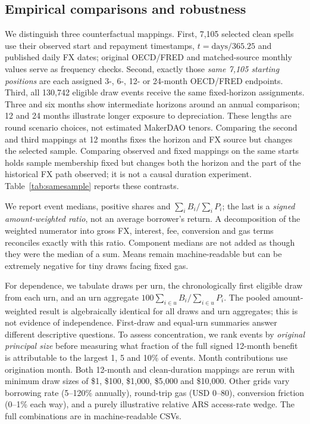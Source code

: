 \documentclass[sn-vancouver,Numbered]{sn-jnl}
\begin{document}
\subsection{Empirical comparisons and robustness}
We distinguish three counterfactual mappings. First, 7,105 selected clean spells use their observed start and repayment timestamps, $t=\text{days}/365.25$ and published daily FX dates; original OECD/FRED and matched-source monthly values serve as frequency checks. Second, exactly those \emph{same 7,105 starting positions} are each assigned 3-, 6-, 12- or 24-month OECD/FRED endpoints. Third, all 130,742 eligible draw events receive the same fixed-horizon assignments. Three and six months show intermediate horizons around an annual comparison; 12 and 24 months illustrate longer exposure to depreciation. These lengths are round scenario choices, not estimated MakerDAO tenors. Comparing the second and third mappings at 12 months fixes the horizon and FX source but changes the selected sample. Comparing observed and fixed mappings on the same starts holds sample membership fixed but changes both the horizon and the part of the historical FX path observed; it is not a causal duration experiment. Table~\ref{tab:samesample} reports these contrasts.

We report event medians, positive shares and $\sum_i B_i/\sum_iP_i$; the last is a \emph{signed amount-weighted ratio}, not an average borrower's return. A decomposition of the weighted numerator into gross FX, interest, fee, conversion and gas terms reconciles exactly with this ratio. Component medians are not added as though they were the median of a sum. Means remain machine-readable but can be extremely negative for tiny draws facing fixed gas.

For dependence, we tabulate draws per urn, the chronologically first eligible draw from each urn, and an urn aggregate $100\sum_{i\in u}B_i/\sum_{i\in u}P_i$. The pooled amount-weighted result is algebraically identical for all draws and urn aggregates; this is not evidence of independence. First-draw and equal-urn summaries answer different descriptive questions. To assess concentration, we rank events by \emph{original principal size} before measuring what fraction of the full signed 12-month benefit is attributable to the largest 1, 5 and 10\% of events. Month contributions use origination month. Both 12-month and clean-duration mappings are rerun with minimum draw sizes of \$1, \$100, \$1,000, \$5,000 and \$10,000. Other grids vary borrowing rate (5--120\% annually), round-trip gas (USD 0--80), conversion friction (0--1\% each way), and a purely illustrative relative ARS access-rate wedge. The full combinations are in machine-readable CSVs.
\end{document}
